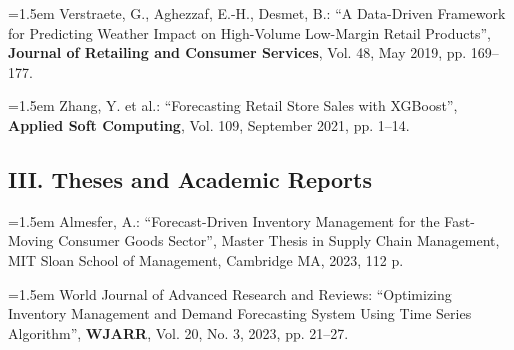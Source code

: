 \medskip\hangindent=1.5em
Verstraete, G., Aghezzaf, E.-H., Desmet, B.: ``A Data-Driven Framework for
Predicting Weather Impact on High-Volume Low-Margin Retail Products'',
\textbf{Journal of Retailing and Consumer Services}, Vol. 48, May 2019,
pp. 169--177.

\medskip\hangindent=1.5em
Zhang, Y. et al.: ``Forecasting Retail Store Sales with XGBoost'',
\textbf{Applied Soft Computing}, Vol. 109, September 2021, pp. 1--14.

\subsection*{III. Theses and Academic Reports}

\hangindent=1.5em
Almesfer, A.: ``Forecast-Driven Inventory Management for the Fast-Moving
Consumer Goods Sector'', Master Thesis in Supply Chain Management, MIT
Sloan School of Management, Cambridge MA, 2023, 112 p.

\medskip\hangindent=1.5em
World Journal of Advanced Research and Reviews: ``Optimizing Inventory
Management and Demand Forecasting System Using Time Series Algorithm'',
\textbf{WJARR}, Vol. 20, No. 3, 2023, pp. 21--27.
